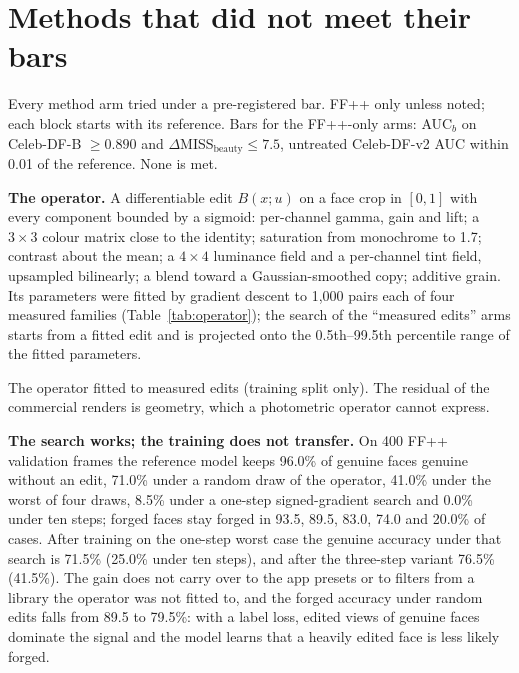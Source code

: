 \documentclass[10pt]{article}
\begin{document}
\section{Methods that did not meet their bars}
\begin{table}[h]
\centering
\caption{Every method arm tried under a pre-registered bar. FF++ only unless noted; each block starts with its
reference. Bars for the FF++-only arms: AUC$_b$ on Celeb-DF-B $\ge 0.890$ and $\Delta$MISS$_\text{beauty}\le 7.5$,
untreated Celeb-DF-v2 AUC within 0.01 of the reference. None is met.}
\label{tab:negative}
\footnotesize
\begin{adjustbox}{max width=\linewidth}\end{adjustbox}
\end{table}
\textbf{The operator.} A differentiable edit $B(x;u)$ on a face crop in $[0,1]$ with every component bounded by a
sigmoid: per-channel gamma, gain and lift; a $3\times3$ colour matrix close to the identity; saturation from monochrome
to 1.7; contrast about the mean; a $4\times4$ luminance field and a per-channel tint field, upsampled bilinearly; a blend
toward a Gaussian-smoothed copy; additive grain. Its parameters were fitted by gradient descent to 1,000 pairs each of
four measured families (Table~\ref{tab:operator}); the search of the ``measured edits'' arms starts from a fitted edit and
is projected onto the 0.5th--99.5th percentile range of the fitted parameters.
\begin{table}[h]
\centering
\caption{The operator fitted to measured edits (training split only). The residual of the commercial renders is
geometry, which a photometric operator cannot express.}
\label{tab:operator}
\footnotesize

\end{table}

\textbf{The search works; the training does not transfer.} On 400 FF++ validation frames the reference model keeps
96.0\% of genuine faces genuine without an edit, 71.0\% under a random draw of the operator, 41.0\% under the worst of
four draws, 8.5\% under a one-step signed-gradient search and 0.0\% under ten steps; forged faces stay forged in 93.5,
89.5, 83.0, 74.0 and 20.0\% of cases. After training on the one-step worst case the genuine accuracy under that search
is 71.5\% (25.0\% under ten steps), and after the three-step variant 76.5\% (41.5\%). The gain does not carry over to the
app presets or to filters from a library the operator was not fitted to, and the forged accuracy under random edits falls
from 89.5 to 79.5\%: with a label loss, edited views of genuine faces dominate the signal and the model learns that a
heavily edited face is less likely forged.
\end{document}
